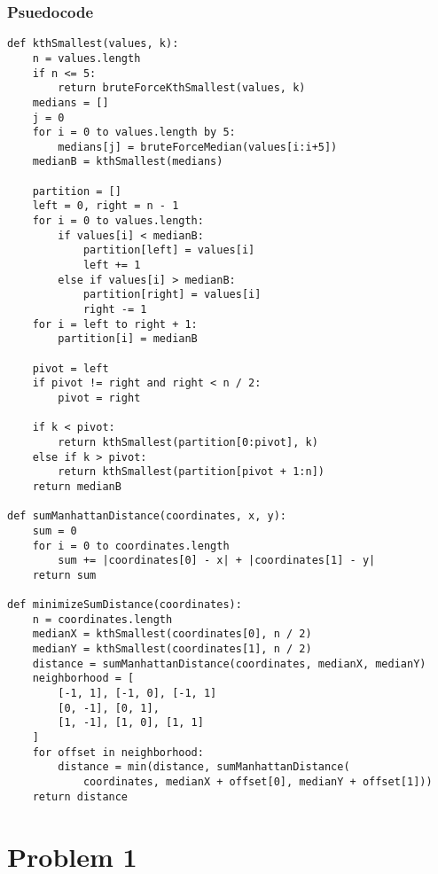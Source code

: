 \documentclass{math}
\begin{document}
\subsubsection*{Psuedocode}
\begin{lstlisting}
def kthSmallest(values, k):
    n = values.length
    if n <= 5:
        return bruteForceKthSmallest(values, k)
    medians = []
    j = 0
    for i = 0 to values.length by 5:
        medians[j] = bruteForceMedian(values[i:i+5])
    medianB = kthSmallest(medians)

    partition = []
    left = 0, right = n - 1
    for i = 0 to values.length:
        if values[i] < medianB:
            partition[left] = values[i]
            left += 1
        else if values[i] > medianB:
            partition[right] = values[i]
            right -= 1
    for i = left to right + 1:
        partition[i] = medianB

    pivot = left
    if pivot != right and right < n / 2:
        pivot = right

    if k < pivot:
        return kthSmallest(partition[0:pivot], k)
    else if k > pivot:
        return kthSmallest(partition[pivot + 1:n])
    return medianB

def sumManhattanDistance(coordinates, x, y):
    sum = 0
    for i = 0 to coordinates.length
        sum += |coordinates[0] - x| + |coordinates[1] - y|
    return sum

def minimizeSumDistance(coordinates):
    n = coordinates.length
    medianX = kthSmallest(coordinates[0], n / 2)
    medianY = kthSmallest(coordinates[1], n / 2)
    distance = sumManhattanDistance(coordinates, medianX, medianY)
    neighborhood = [
        [-1, 1], [-1, 0], [-1, 1]
        [0, -1], [0, 1],
        [1, -1], [1, 0], [1, 1]
    ]
    for offset in neighborhood:
        distance = min(distance, sumManhattanDistance(
            coordinates, medianX + offset[0], medianY + offset[1]))
    return distance
\end{lstlisting}

\section*{Problem 1}
\end{document}
